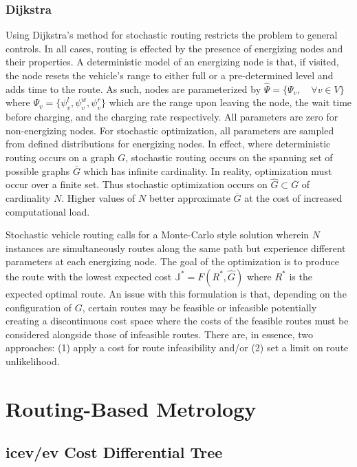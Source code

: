 \documentclass[12pt]{article}
\begin{document}
\subsubsection*{Dijkstra}

Using Dijkstra's method for stochastic routing restricts the problem to general controls. In all cases, routing is effected by the presence of energizing nodes and their properties. A deterministic model of an energizing node is that, if visited, the node resets the vehicle's range to either full or a pre-determined level and adds time to the route. As such, nodes are parameterized by $\hat{\Psi} = \{\Psi_v,\quad \forall v\in V\}$ where $\Psi_v = \{\psi_v^l,\psi_v^w,\psi_v^r\}$ which are the range upon leaving the node, the wait time before charging, and the charging rate respectively. All parameters are zero for non-energizing nodes. For stochastic optimization, all parameters are sampled from defined distributions for energizing nodes. In effect, where deterministic routing occurs on a graph $G$, stochastic routing occurs on the spanning set of possible graphs $\overline{G}$ which has infinite cardinality. In reality, optimization must occur over a finite set. Thus stochastic optimization occurs on $\hat{G}\subset\overline{G}$ of cardinality $N$. Higher values of $N$ better approximate $\overline{G}$ at the cost of increased computational load.


Stochastic vehicle routing calls for a Monte-Carlo style solution wherein $N$ instances are simultaneously routes along the same path but experience different parameters at each energizing node. The goal of the optimization is to produce the route with the lowest expected cost $\mathbb{J}^* = F(R^*,\hat{G})$ where $R^*$ is the expected optimal route. An issue with this formulation is that, depending on the configuration of $G$, certain routes may be feasible or infeasible potentially creating a discontinuous cost space where the costs of the feasible routes must be considered alongside those of infeasible routes. There are, in essence, two approaches: (1) apply a cost for route infeasibility and/or (2) set a limit on route unlikelihood. 

\section*{Routing-Based Metrology}

\subsection*{\gls{icev}/\gls{ev} Cost Differential Tree}
\end{document}
